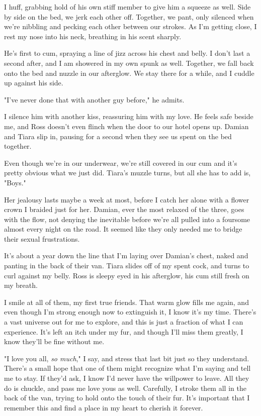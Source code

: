 I huff, grabbing hold of his own stiff member to give him a squeeze as well. Side by side on the bed, we jerk each other off. Together, we pant, only silenced when we're nibbling and pecking each other between our strokes. As I'm getting close, I rest my nose into his neck, breathing in his scent sharply.

He's first to cum, spraying a line of jizz across his chest and belly. I don't last a second after, and I am showered in my own spunk as well. Together, we fall back onto the bed and nuzzle in our afterglow. We stay there for a while, and I cuddle up against his side.

"I've never done that with another guy before," he admits.

I silence him with another kiss, reassuring him with my love. He feels safe beside me, and Ross doesn't even flinch when the door to our hotel opens up. Damian and Tiara slip in, pausing for a second when they see us spent on the bed together.

Even though we're in our underwear, we're still covered in our cum and it's pretty obvious what we just did. Tiara's muzzle turns, but all she has to add is, "Boys."

Her jealousy lasts maybe a week at most, before I catch her alone with a flower crown I braided just for her. Damian, ever the most relaxed of the three, goes with the flow, not denying the inevitable before we're all pulled into a foursome almost every night on the road. It seemed like they only needed me to bridge their sexual frustrations.

It's about a year down the line that I'm laying over Damian's chest, naked and panting in the back of their van. Tiara slides off of my spent cock, and turns to curl against my belly. Ross is sleepy eyed in his afterglow, his cum still fresh on my breath.

I smile at all of them, my first true friends. That warm glow fills me again, and even though I'm strong enough now to extinguish it, I know it's my time. There's a vast universe out for me to explore, and this is just a fraction of what I can experience. It's left an itch under my fur, and though I'll miss them greatly, I know they'll be fine without me.

"I love you all, \emph{so much}," I say, and stress that last bit just so they understand. There's a small hope that one of them might recognize what I'm saying and tell me to stay. If they'd ask, I know I'd never have the willpower to leave. All they do is chuckle, and pass me love yous as well. Carefully, I stroke them all in the back of the van, trying to hold onto the touch of their fur. It's important that I remember this and find a place in my heart to cherish it forever.

